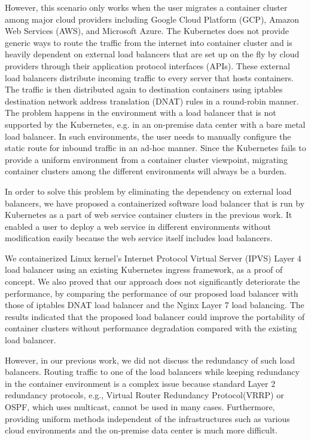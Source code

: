 However, this scenario only works when the user migrates a container cluster among major cloud providers including Google Cloud Platform (GCP), 
Amazon Web Services (AWS), and Microsoft Azure.
The Kubernetes does not provide generic ways to route the traffic from the internet into container cluster and is 
heavily dependent on external load balancers that are set up on the fly by cloud providers through their application protocol interfaces (APIs).
%
These external load balancers distribute incoming traffic to every server that hosts containers.
The traffic is then distributed again to destination containers using iptables destination 
network address translation (DNAT)\cite{MartinA.Brown2017,Marmol2015} rules in a round-robin manner. 
The problem happens in the environment with a load balancer that is not supported by the Kubernetes, 
e.g. in an on-premise data center with a bare metal load balancer. 
In such environments, the user needs to manually configure 
the static route for inbound traffic in an ad-hoc manner. 
Since the Kubernetes fails to provide a uniform environment from a container cluster viewpoint,
migrating container clusters among the different environments will always be a burden.

In order to solve this problem by eliminating the dependency on external load balancers,
we have proposed a containerized software load balancer that is run by Kubernetes as  
a part of web service container clusters in the previous work\cite{takahashi2018portable}.
It enabled a user to deploy a web service in different environments without modification easily 
because the web service itself includes load balancers.

We containerized Linux kernel's Internet Protocol Virtual Server (IPVS)\cite{Zhang2000} 
Layer 4 load balancer using an existing Kubernetes ingress\cite{K8sIngress2017} framework, as a proof of concept.
%
%
We also proved that our approach does not significantly deteriorate the performance,
by comparing the performance of our proposed load balancer with those of
iptables DNAT load balancer and the Nginx Layer 7 load balancing.
%
The results indicated that the proposed load balancer could improve the portability of container clusters without performance degradation compared with the existing load balancer.

However, in our previous work, we did not discuss the redundancy of such load balancers.
Routing traffic to one of the load balancers while keeping redundancy in the container environment is a complex issue
because standard Layer 2 redundancy protocols, e.g., Virtual Router Redundancy Protocol(VRRP)\cite{hinden2004virtual}
or OSPF\cite{moy1997ospf}, which uses multicast, cannot be used in many cases.
Furthermore, providing uniform methods independent of the infrastructures such as various cloud environments and the on-premise data center is much more difficult.

